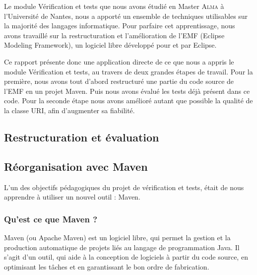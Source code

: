 \documentclass[a4paper]{article}
\begin{document}
	\vspace{0.5cm}

	Le module Vérification et tests que nous avons étudié en Master \textsc{Alma} à l’Université de Nantes, nous a apporté un ensemble de techniques utilisables sur la majorité des langages informatique. Pour parfaire cet apprentissage, nous avons travaillé sur la restructuration et l'amélioration de l'EMF (Eclipse Modeling Framework), un logiciel libre développé pour et par Eclipse.

	\vspace{0.5cm}

	Ce rapport présente donc une application directe de ce que nous a appris le module Vérification et tests, au travers de deux grandes étapes de travail. Pour la première, nous avons tout d'abord restructuré une partie du code source de l'EMF en un projet Maven. Puis nous avons évalué les tests déjà présent dans ce code. Pour la seconde étape nous avons amélioré autant que possible la qualité de la classe URI, afin d'augmenter sa fiabilité.

	\newpage


	\begin{center}
		\section{Restructuration et évaluation}
	\end{center}

	\vspace{0.5cm}

		\subsection{Réorganisation avec Maven}

		\vspace{0.5cm}

		L'un des objectifs pédagogiques du projet de vérification et tests, était de nous apprendre à utiliser un nouvel outil : Maven. 

		\subsubsection{Qu'est ce que Maven ?}

		\vspace{0.5cm}

		Maven (ou Apache Maven) est un logiciel libre, qui permet la gestion et la production automatique de projets liés au langage de programmation Java. Il s'agit d'un outil, qui aide à la conception de logiciels à partir du code source, en optimisant les tâches et en garantissant le bon ordre de fabrication.
\end{document}
